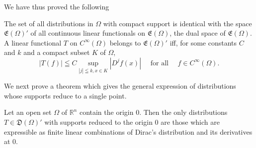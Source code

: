 We have thus proved the following 


\begin{theorem}\label{thm:I.13.Theorem.2} The set of all distributions in $\Omega$ with compact support is identical with the space $\mathfrak{E}(\Omega)'$ of all continuous linear functionals on $\mathfrak{E}(\Omega)$, the dual space of $\mathfrak{E}(\Omega)$. A linear functional $T$ on $C^\infty(\Omega)$ belongs to $\mathfrak{E}(\Omega)'$ iff, for some constants $C$ and $k$ and a compact subset $K$ of $\Omega$, 
\[
\left| T (f) \right| \leqq C \sup\limits_{| j | \leqq k, x \in K} \left| D ^{j} f (x) \right| \quad \text{ for all } \quad f \in C ^{\infty} (\Omega).
\]
\end{theorem}

We next prove a theorem which gives the general expression of distributions whose supports reduce to a single point. 

\begin{theorem}\label{thm:I.13.Theorem.3} Let an open set $\Omega$ of $\mathbb{R}^{n}$ contain the origin $0$. Then the only distributions $T \in \mathfrak{D}(\Omega)'$ with supports reduced to the origin $0$ are those which are expressible as finite linear combinations of Dirac's distribution and its derivatives at $0$. 
\end{theorem}

